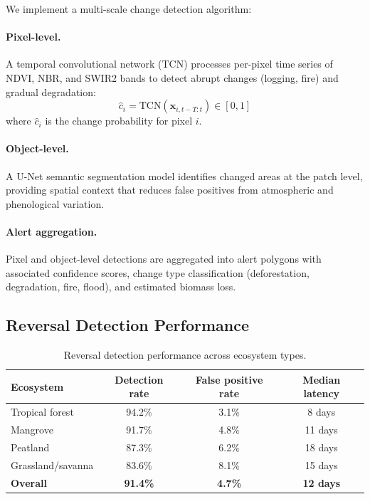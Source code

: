 \documentclass[11pt,a4paper]{article}
\begin{document}
We implement a multi-scale change detection algorithm:

\paragraph{Pixel-level.} A temporal convolutional network (TCN) processes
per-pixel time series of NDVI, NBR, and SWIR2 bands to detect abrupt
changes (logging, fire) and gradual degradation:
\begin{equation}
  \hat{c}_i = \text{TCN}(\mathbf{x}_{i,t-T:t}) \in [0,1]
\end{equation}
where $\hat{c}_i$ is the change probability for pixel $i$.

\paragraph{Object-level.} A U-Net semantic segmentation model
identifies changed areas at the patch level, providing spatial context
that reduces false positives from atmospheric and phenological variation.

\paragraph{Alert aggregation.} Pixel and object-level detections are
aggregated into alert polygons with associated confidence scores,
change type classification (deforestation, degradation, fire, flood),
and estimated biomass loss.

\subsection{Reversal Detection Performance}

\begin{table}[H]
\centering
\caption{Reversal detection performance across ecosystem types.}
\label{tab:reversals}
\begin{tabular}{lccc}
\toprule
\textbf{Ecosystem} & \textbf{Detection rate} &
  \textbf{False positive rate} & \textbf{Median latency} \\
\midrule
Tropical forest & 94.2\% & 3.1\% & 8 days \\
Mangrove & 91.7\% & 4.8\% & 11 days \\
Peatland & 87.3\% & 6.2\% & 18 days \\
Grassland/savanna & 83.6\% & 8.1\% & 15 days \\
\midrule
\textbf{Overall} & \textbf{91.4\%} & \textbf{4.7\%} &
  \textbf{12 days} \\
\bottomrule
\end{tabular}
\end{table}
\end{document}
